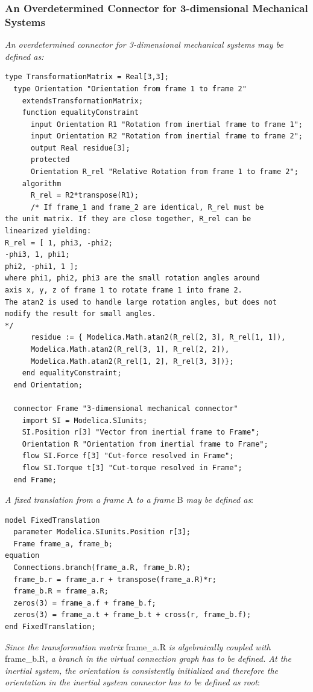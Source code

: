 \documentclass[10pt,a4paper]{report}
\def\doublelabel#1{\label{#1}}
\begin{document}
\subsubsection{An Overdetermined Connector for 3-dimensional Mechanical Systems}\doublelabel{an-overdetermined-connector-for-3-dimensional-mechanical-systems}

\emph{An overdetermined connector for 3-dimensional mechanical systems
may be defined as:}

\begin{lstlisting}[language=modelica]
  type TransformationMatrix = Real[3,3];
  type Orientation "Orientation from frame 1 to frame 2"
    extendsTransformationMatrix;
    function equalityConstraint
      input Orientation R1 "Rotation from inertial frame to frame 1";
      input Orientation R2 "Rotation from inertial frame to frame 2";
      output Real residue[3];
      protected
      Orientation R_rel "Relative Rotation from frame 1 to frame 2";
    algorithm
      R_rel = R2*transpose(R1);
      /* If frame_1 and frame_2 are identical, R_rel must be
the unit matrix. If they are close together, R_rel can be
linearized yielding:
R_rel = [ 1, phi3, -phi2;
-phi3, 1, phi1;
phi2, -phi1, 1 ];
where phi1, phi2, phi3 are the small rotation angles around
axis x, y, z of frame 1 to rotate frame 1 into frame 2.
The atan2 is used to handle large rotation angles, but does not
modify the result for small angles.
*/
      residue := { Modelica.Math.atan2(R_rel[2, 3], R_rel[1, 1]),
      Modelica.Math.atan2(R_rel[3, 1], R_rel[2, 2]),
      Modelica.Math.atan2(R_rel[1, 2], R_rel[3, 3])};
    end equalityConstraint;
  end Orientation;

  connector Frame "3-dimensional mechanical connector"
    import SI = Modelica.SIunits;
    SI.Position r[3] "Vector from inertial frame to Frame";
    Orientation R "Orientation from inertial frame to Frame";
    flow SI.Force f[3] "Cut-force resolved in Frame";
    flow SI.Torque t[3] "Cut-torque resolved in Frame";
  end Frame;
\end{lstlisting}
\emph{A fixed translation from a frame} A \emph{to a frame} B \emph{may
be defined as}:

\begin{lstlisting}[language=modelica]
model FixedTranslation
  parameter Modelica.SIunits.Position r[3];
  Frame frame_a, frame_b;
equation
  Connections.branch(frame_a.R, frame_b.R);
  frame_b.r = frame_a.r + transpose(frame_a.R)*r;
  frame_b.R = frame_a.R;
  zeros(3) = frame_a.f + frame_b.f;
  zeros(3) = frame_a.t + frame_b.t + cross(r, frame_b.f);
end FixedTranslation;
\end{lstlisting}
\emph{Since the transformation matrix} frame\_a.R \emph{is algebraically
coupled with} frame\_b.R\emph{, a branch in the virtual connection graph
has to be defined. At the inertial system, the orientation is
consistently initialized and therefore the orientation in the inertial
system connector has to be defined as root}:
\end{document}
